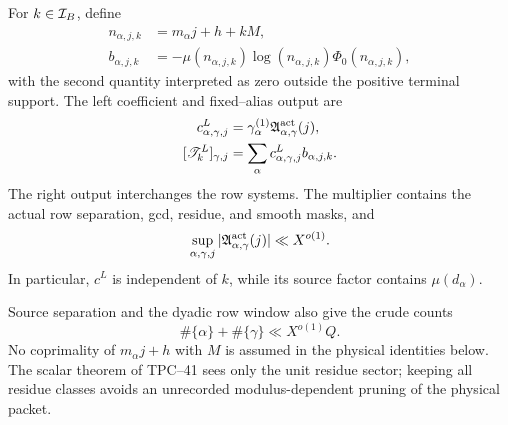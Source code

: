 For \(k\in\mathcal I_B\), define
\begin{align}
 n_{\alpha,j,k}
 &=m_\alpha j+h+kM,
 \label{eq:tpc42-terminal-n}\\
 b_{\alpha,j,k}
 &=-\mu(n_{\alpha,j,k})\log(n_{\alpha,j,k})
   \Phi_0(n_{\alpha,j,k}),
 \label{eq:tpc42-terminal-b}
\end{align}
with the second quantity interpreted as zero outside the positive
terminal support.  The left coefficient and fixed--alias output are
\begin{align}
 c^L_{\alpha,\gamma,j}
 &=\gamma_\alpha^{(1)}
   \mathfrak A_{\alpha,\gamma}^{\rm act}(j),
 \label{eq:tpc42-left-c}\\
 [\mathscr T_k^L]_{\gamma,j}
 &=\sum_\alpha c^L_{\alpha,\gamma,j}b_{\alpha,j,k}.
 \label{eq:tpc42-left-column}
\end{align}
The right output interchanges the row systems.  The multiplier contains
the actual row separation, gcd, residue, and smooth masks, and
\begin{equation}
 \sup_{\alpha,\gamma,j}
 |\mathfrak A_{\alpha,\gamma}^{\rm act}(j)|
 \ll X^{o(1)}.
 \label{eq:tpc42-multiplier-bound}
\end{equation}
In particular, \(c^L\) is independent of \(k\), while its source factor
contains \(\mu(d_\alpha)\).

Source separation and the dyadic row window also give the crude counts
\begin{equation}
 \#\{\alpha\}+\#\{\gamma\}\ll X^{o(1)}Q.
 \label{eq:tpc42-row-counts}
\end{equation}
No coprimality of \(m_\alpha j+h\) with \(M\) is assumed in the physical
identities below.  The scalar theorem of TPC--41 sees only the unit
residue sector; keeping all residue classes avoids an unrecorded
modulus-dependent pruning of the physical packet.

